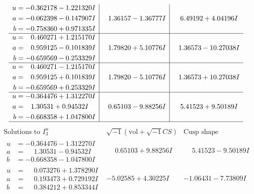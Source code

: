 \documentclass[1p]{elsarticle_modified}
\theoremstyle{definition}
\newcommand{\I}{\sqrt{-1}}
\begin{document}
$$\begin{array}{c|c|c}
\begin{aligned}
u &= -0.362178 - 1.221320 I \\
a &= -0.062398 - 0.147907 I \\
b &= -0.758360 + 0.971335 I\end{aligned}
 & \phantom{-}1.36157 - 1.36777 I & \phantom{-}6.49192 + 4.04196 I \\ \hline\begin{aligned}
u &= \phantom{-}0.460271 + 1.215170 I \\
a &= \phantom{-}0.959125 - 0.101839 I \\
b &= -0.659569 - 0.253329 I\end{aligned}
 & \phantom{-}1.79820 + 5.10776 I & \phantom{-}1.36573 - 10.27038 I \\ \hline\begin{aligned}
u &= \phantom{-}0.460271 - 1.215170 I \\
a &= \phantom{-}0.959125 + 0.101839 I \\
b &= -0.659569 + 0.253329 I\end{aligned}
 & \phantom{-}1.79820 - 5.10776 I & \phantom{-}1.36573 + 10.27038 I \\ \hline\begin{aligned}
u &= -0.364476 + 1.312270 I \\
a &= \phantom{-}1.30531 + 0.94532 I \\
b &= -0.668358 + 1.047800 I\end{aligned}
 & \phantom{-}0.65103 - 9.88256 I & \phantom{-}5.41523 + 9.50189 I\\
 \hline 
 \end{array}$$\newpage$$\begin{array}{c|c|c}  
\text{Solutions to }I^u_{3}& \I (\text{vol} + \sqrt{-1}CS) & \text{Cusp shape}\\
 \hline 
\begin{aligned}
u &= -0.364476 - 1.312270 I \\
a &= \phantom{-}1.30531 - 0.94532 I \\
b &= -0.668358 - 1.047800 I\end{aligned}
 & \phantom{-}0.65103 + 9.88256 I & \phantom{-}5.41523 - 9.50189 I \\ \hline\begin{aligned}
u &= \phantom{-}0.073276 + 1.378290 I \\
a &= \phantom{-}0.193473 + 0.729192 I \\
b &= \phantom{-}0.384212 + 0.853344 I\end{aligned}
 & -5.02585 + 4.30225 I & -1.06431 - 7.73809 I \\ \hline\begin{aligned}

\end{aligned}
\end{array}$$
\end{document}
